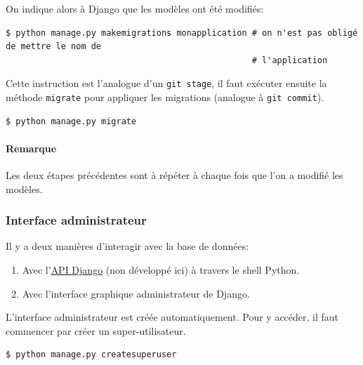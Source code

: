 \documentclass[a4paper, 10pt]{article}
\begin{document}
On indique alors à Django que les modèles ont été modifiés:
\begin{verbatim}
$ python manage.py makemigrations monapplication # on n'est pas obligé de mettre le nom de
                                                 # l'application
\end{verbatim}

Cette instruction est l'analogue d'un \texttt{git stage}, il faut exécuter ensuite la méthode \texttt{migrate} pour appliquer les migrations (analogue à \texttt{git commit}).

\begin{verbatim}
$ python manage.py migrate
\end{verbatim}

\paragraph{Remarque} Les deux étapes précédentes sont à répéter à chaque fois que l'on a modifié les modèles.

\subsubsection{Interface administrateur}
Il y a deux manières d'interagir avec la base de données:
\begin{enumerate}
    \item Avec l'\href{https://docs.djangoproject.com/fr/2.0/topics/db/queries/}{API Django} (non développé ici) à travers le shell Python.
    \item Avec l'interface graphique administrateur de Django.
\end{enumerate}

L'interface administrateur est créée automatiquement. Pour y accéder, il faut commencer par créer un super-utilisateur.

\begin{verbatim}
$ python manage.py createsuperuser
\end{verbatim}
\end{document}
